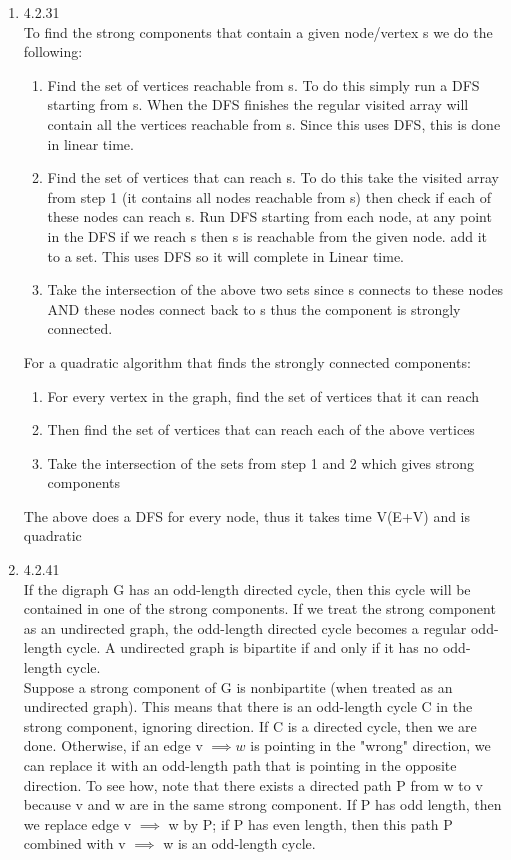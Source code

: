 \documentclass[11pt,fleqn]{article}
\begin{document}
\begin{enumerate}
\item 4.2.31\\
To find the strong components that contain a given node/vertex s we do the following:
\begin{enumerate}
\item Find the set of vertices reachable from s. To do this simply run a DFS starting from s. When the DFS finishes the regular visited array will contain all the vertices reachable from s. Since this uses DFS, this is done in linear time.
\item Find the set of vertices that can reach s. To do this take the visited array from step 1 (it contains all nodes reachable from s) then check if each of these nodes can reach s. Run DFS starting from each node, at any point in the DFS if we reach s then s is reachable from the given node. add it to a set. This uses DFS so it will complete in Linear time.
\item Take the intersection of the above two sets since s connects to these nodes AND these nodes connect back to s thus the component is strongly connected. 
\end{enumerate}
For a quadratic algorithm that finds the strongly connected components:
\begin{enumerate}
\item For every vertex in the graph, find the set of vertices that it can reach
\item Then find the set of vertices that can reach each of the above vertices
\item Take the intersection of the sets from step 1 and 2 which gives strong components
\end{enumerate}

The above does a DFS for every node, thus it takes time V(E+V) and is quadratic

\item 4.2.41\\
If the digraph G has an odd-length directed cycle, then this cycle will be contained in one of the strong components. If we treat the strong component as an undirected graph, the odd-length directed cycle becomes a regular odd-length cycle. A undirected graph is bipartite if and only if it has no odd-length cycle.\\

Suppose a strong component of G is nonbipartite (when treated as an undirected graph). This means that there is an odd-length cycle C in the strong component, ignoring direction. If C is a directed cycle, then we are done. Otherwise, if an edge v $\implies w$ is pointing in the "wrong" direction, we can replace it with an odd-length path that is pointing in the opposite direction. To see how, note that there exists a directed path P from w to v because v and w are in the same strong component. If P has odd length, then we replace edge v $\implies$ w by P; if P has even length, then this path P combined with v $\implies$ w is an odd-length cycle.\\


\end{enumerate}
\end{document}
